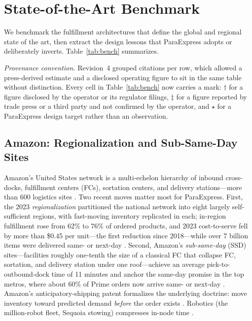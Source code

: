 \documentclass[10pt,twocolumn,letterpaper]{article}
\theoremstyle{definition}
\begin{document}
\section{State-of-the-Art Benchmark}\label{sec:bench}

We benchmark the fulfillment architectures that define the global and regional state of the art, then extract the design lessons that ParaExpress adopts or deliberately inverts. Table~\ref{tab:bench} summarizes.

\emph{Provenance convention.} Revision~4 grouped citations per row, which allowed a press-derived estimate and a disclosed operating figure to sit in the same table without distinction. Every cell in Table~\ref{tab:bench} now carries a mark: $\dagger$ for a figure disclosed by the operator or its regulator filings, $\ddagger$ for a figure reported by trade press or a third party and not confirmed by the operator, and $\star$ for a ParaExpress design target rather than an observation.

\subsection{Amazon: Regionalization and Sub-Same-Day Sites}
Amazon's United States network is a multi-echelon hierarchy of inbound cross-docks, fulfillment centers (FCs), sortation centers, and delivery stations---more than 600 logistics sites \cite{redstag}. Two recent moves matter most for ParaExpress. First, the 2023 \emph{regionalization} partitioned the national network into eight largely self-sufficient regions, with fast-moving inventory replicated in each; in-region fulfillment rose from 62\% to 76\% of ordered products, and 2023 cost-to-serve fell by more than \$0.45 per unit---the first reduction since 2018---while over 7 billion items were delivered same- or next-day \cite{chandra2026,amazonscience,supplychaindive2023}. Second, Amazon's \emph{sub-same-day} (SSD) sites---facilities roughly one-tenth the size of a classical FC that collapse FC, sortation, and delivery station under one roof---achieve an average pick-to-outbound-dock time of 11 minutes and anchor the same-day promise in the top metros, where about 60\% of Prime orders now arrive same- or next-day \cite{costar2024,palmer2024}. Amazon's anticipatory-shipping patent formalizes the underlying doctrine: move inventory toward predicted demand \emph{before} the order exists \cite{spiegel2013}. Robotics (the million-robot fleet, Sequoia stowing) compresses in-node time \cite{amazon2023robots,techcrunch2025}.
\end{document}
